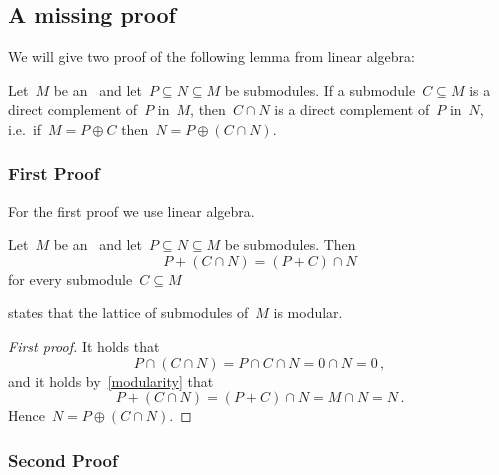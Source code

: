 \section{}





\subsection*{A missing proof}

We will give two proof of the following lemma from linear algebra:

\begin{lemma}
  Let~$M$ be an~{} and let~$P \subseteq N \subseteq M$ be submodules.
  If a submodule~$C \subseteq M$ is a direct complement of~$P$ in~$M$, then~$C \cap N$ is a direct complement of~$P$ in~$N$, i.e.\ if~$M = P \oplus C$ then~$N = P \oplus (C \cap N)$.
\end{lemma}



\subsubsection*{First Proof}

For the first proof we use linear algebra.

\begin{recall}
  \label{modularity}
  Let~$M$ be an~{} and let~$P \subseteq N \subseteq M$ be submodules.
  Then
  \[
      P + (C \cap N)
    = (P + C) \cap N
  \]
  for every submodule~$C \subseteq M$
\end{recall}

\begin{remark}
   states that the lattice of submodules of~$M$ is modular.
\end{remark}

\begin{proof}[First proof]
  It holds that
  \[
      P \cap (C \cap N)
    = P \cap C \cap N
    = 0 \cap N
    = 0 \,,
  \]
  and it holds by~\cref{modularity} that
  \[
      P + (C \cap N)
    = (P + C) \cap N
    = M \cap N
    = N \,.
  \]
  Hence~$N = P \oplus (C \cap N)$.
\end{proof}



\subsubsection*{Second Proof}

